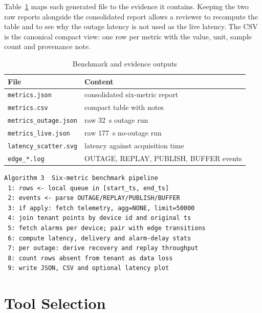 \documentclass[conference]{IEEEtran}
\begin{document}
Table~\ref{tab:evidence-files} maps each generated file to the evidence it
contains. Keeping the two raw reports alongside the consolidated report allows a
reviewer to recompute the table and to see why the outage latency is not used as
the live latency. The CSV is the canonical compact view: one row per metric with
the value, unit, sample count and provenance note.

\begin{table}[t]
\caption{Benchmark and evidence outputs}
\label{tab:evidence-files}
\centering
\scriptsize
\begin{tabular}{@{}ll@{}}
\toprule
File & Content \\
\midrule
\texttt{metrics.json} & consolidated six-metric report \\
\texttt{metrics.csv} & compact table with notes \\
\texttt{metrics\_outage.json} & raw 32~s outage run \\
\texttt{metrics\_live.json} & raw 177~s no-outage run \\
\texttt{latency\_scatter.svg} & latency against acquisition time \\
\texttt{edge\_*.log} & OUTAGE, REPLAY, PUBLISH, BUFFER events \\
\bottomrule
\end{tabular}
\end{table}

{\tiny
\begin{verbatim}
Algorithm 3  Six-metric benchmark pipeline
 1: rows <- local queue in [start_ts, end_ts]
 2: events <- parse OUTAGE/REPLAY/PUBLISH/BUFFER
 3: if apply: fetch telemetry, agg=NONE, limit=50000
 4: join tenant points by device id and original ts
 5: fetch alarms per device; pair with edge transitions
 6: compute latency, delivery and alarm-delay stats
 7: per outage: derive recovery and replay throughput
 8: count rows absent from tenant as data loss
 9: write JSON, CSV and optional latency plot
\end{verbatim}
}

\section{Tool Selection}
\label{sec:tools}
\end{document}

